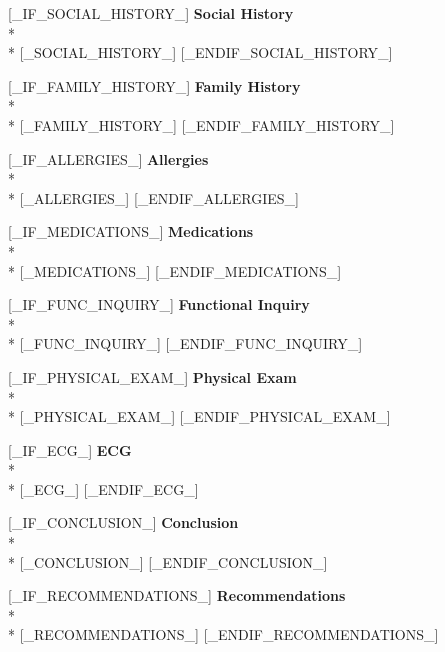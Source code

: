 \documentclass[10pt,letterpaper]{letter}
\begin{document}
[_IF_SOCIAL_HISTORY_]
\Large\textbf{Social History}
\\*\\*
\small{[_SOCIAL_HISTORY_]}
[_ENDIF_SOCIAL_HISTORY_]

[_IF_FAMILY_HISTORY_]
\Large\textbf{Family History}
\\*\\*
\small{[_FAMILY_HISTORY_]}
[_ENDIF_FAMILY_HISTORY_]

[_IF_ALLERGIES_]
\Large\textbf{Allergies}
\\*\\*
\small{[_ALLERGIES_]}
[_ENDIF_ALLERGIES_]

[_IF_MEDICATIONS_]
\Large\textbf{Medications}
\\*\\*
\small{[_MEDICATIONS_]}
[_ENDIF_MEDICATIONS_]

[_IF_FUNC_INQUIRY_]
\Large\textbf{Functional Inquiry}
\\*\\*
\small{[_FUNC_INQUIRY_]}
[_ENDIF_FUNC_INQUIRY_]

[_IF_PHYSICAL_EXAM_]
\Large\textbf{Physical Exam}
\\*\\*
\small{[_PHYSICAL_EXAM_]}
[_ENDIF_PHYSICAL_EXAM_]

[_IF_ECG_]
\Large\textbf{ECG}
\\*\\*
\small{[_ECG_]}
[_ENDIF_ECG_]

[_IF_CONCLUSION_]
\Large\textbf{Conclusion}
\\*\\*
\small{[_CONCLUSION_]}
[_ENDIF_CONCLUSION_]

[_IF_RECOMMENDATIONS_]
\Large\textbf{Recommendations}
\\*\\*
\small{[_RECOMMENDATIONS_]}
[_ENDIF_RECOMMENDATIONS_]

\vspace{0.5in}
\end{document}
